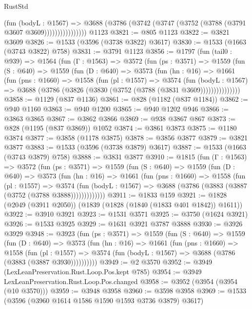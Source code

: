 \begin{lexlean}{RustStd}
\begin{coremodule}
                      (fun (bodyL : @1567) =>
                      @3688 (@3786 (@3742 (@3747 (@3752 (@3788 (@3791 @3607 @3609))))))))))))))))
    @1123
@3821 := @805 @1123
@3822 := @3821 @3609
@3826 := @1533 (@3596 (@3738 @3822) @3617)
@3830 := @1533 (@1663 (@3743 @3822) @758)
@3831 := @3791 @1123
@3856 := @1797
    (fun (tail0 : @939) =>
    @1564
      (fun (Γ : @1563) =>
      @3572
        (fun (ps : @3571) =>
        @1559
          (fun (S : @640) =>
          @1559
            (fun (D : @640) =>
            @3573
              (fun (hn : @16) =>
              @1661
                (fun (pns : @1660) =>
                @1558
                  (fun (pl : @1557) =>
                  @3574
                    (fun (bodyL : @1567) =>
                    @3688 (@3786 (@3826 (@3830 (@3752 (@3788 (@3831 @3609)))))))))))))))
@3858 := @1129 (@837 @1136)
@3861 := @828 (@1182 (@837 @1184))
@3862 := @940 @1160
@3863 := @940 @1200
@3865 := @940 @1202 @946
@3866 := @3863 @3865
@3867 := @3862 @3866
@3869 := @938 @3867 @867
@3873 := @828 (@1195 (@837 @3869)) @1052
@3874 := @3861 @3873
@3875 := @1180 @3874
@3877 := @3858 (@1178 @3875)
@3878 := @3856 @3877
@3879 := @3821 @3877
@3883 := @1533 (@3596 (@3738 @3879) @3617)
@3887 := @1533 (@1663 (@3743 @3879) @758)
@3888 := @3831 @3877
@3910 := @1815
    (fun (Γ : @1563) =>
    @3572
      (fun (ps : @3571) =>
      @1559
        (fun (S : @640) =>
        @1559
          (fun (D : @640) =>
          @3573
            (fun (hn : @16) =>
            @1661
              (fun (pns : @1660) =>
              @1558
                (fun (pl : @1557) =>
                @3574
                  (fun (bodyL : @1567) =>
                  @3688 (@3786 (@3883 (@3887 (@3752 (@3788 @3888)))))))))))))
@3911 := @1833 @159
@3921 := @1828 (@2049 (@3911 @2050)) (@1839 (@1828 (@1840 (@1833 @401 @1842)) @1611))
@3922 := @3910 @3921
@3923 := @1531 @3571
@3925 := @3750 (@1624 @3921)
@3926 := @1533 @3925
@3929 := @1631 @3921 @3787 @3888
@3930 := @3926 @3929
@3948 := @3923
    (fun (ps : @3571) =>
    @1559
      (fun (S : @640) =>
      @1559
        (fun (D : @640) =>
        @3573
          (fun (hn : @16) =>
          @1661
            (fun (pns : @1660) =>
            @1558
              (fun (pl : @1557) =>
              @3574 (fun (bodyL : @1567) => @3688 (@3786 (@3883 (@3887 @3930))))))))))
@3949 := @2 @3570
@3952 := @3949 (LexLeanPreservation.Rust.Loop.Pos.kept @785)
@3954 := @3949 LexLeanPreservation.Rust.Loop.Pos.changed
@3958 := @3952 (@3954 (@3954 (@10 @3570)))
@3959 := @3948 @3958
@3960 := @3598 @3958
@3969 := @1533 (@3596 (@3960 @1614 @1586 @1590 @1593 @3736 @3879) @3617)

\end{coremodule}
\end{lexlean}
